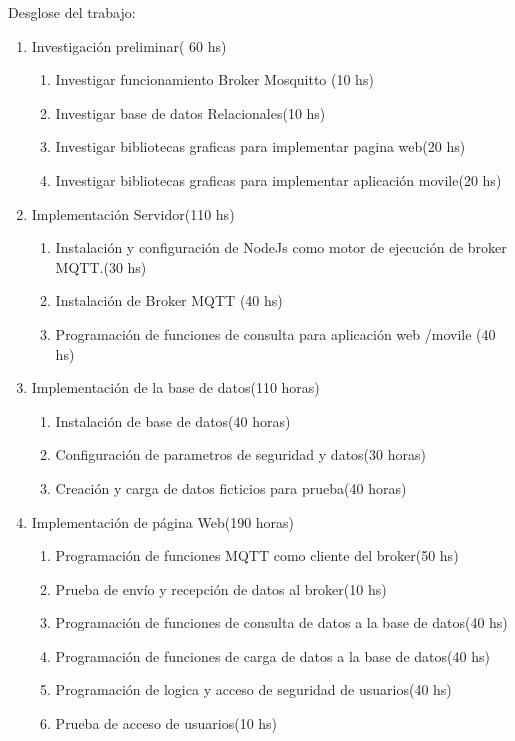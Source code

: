 \documentclass[
11pt, %
]{charter}
\begin{document}
Desglose del trabajo:

\begin{enumerate}
\item Investigación preliminar( 60 hs)
	\begin{enumerate}
	\item Investigar funcionamiento Broker Mosquitto (10 hs)
	\item Investigar base de datos Relacionales(10 hs)
	\item Investigar bibliotecas graficas para implementar pagina web(20 hs)
	\item Investigar bibliotecas graficas para implementar aplicación movile(20 hs)
	\end{enumerate}
\item Implementación Servidor(110 hs)
	\begin{enumerate}
	\item Instalación y configuración de NodeJs como motor de ejecución de broker MQTT.(30 hs)
	\item Instalación de Broker MQTT (40 hs)
	\item Programación de funciones de consulta para aplicación web /movile (40 hs)

	\end{enumerate}
\item Implementación de la base de datos(110 horas)
	\begin{enumerate}
	\item Instalación de base de datos(40 horas)
	\item Configuración de parametros de seguridad y datos(30 horas)
	\item Creación y carga de datos ficticios para prueba(40 horas)

	\end{enumerate}
\item Implementación de página Web(190 horas)
	\begin{enumerate}
	\item Programación de funciones MQTT como cliente del broker(50 hs)
	\item Prueba de envío y recepción de datos al broker(10 hs)
	\item Programación de funciones de consulta de datos a la base de datos(40 hs)
	\item Programación de funciones de carga de datos a la base de datos(40 hs)
	\item Programación de logica y acceso de seguridad de usuarios(40 hs)
	\item Prueba de acceso de usuarios(10 hs)
	\end{enumerate}
	

\end{enumerate}
\end{document}
